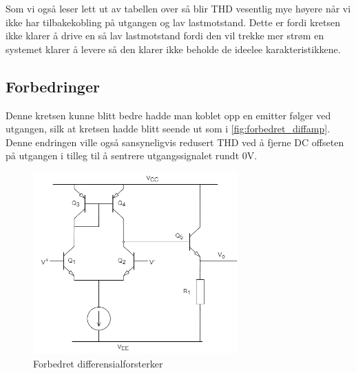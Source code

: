 Som vi også leser lett ut av tabellen over så blir THD vesentlig mye høyere når vi ikke har tilbakekobling på utgangen og lav lastmotstand. Dette er fordi kretsen ikke klarer å drive en så lav lastmotstand fordi den vil trekke mer strøm en systemet klarer å levere så den klarer ikke beholde de ideelee karakteristikkene. 


\subsection{Forbedringer}
\label{forbedringer}
Denne kretsen kunne blitt bedre hadde man koblet opp en emitter følger ved utgangen, silk at kretsen hadde blitt seende ut som i \autoref{fig:forbedret_diffamp}. Denne endringen ville også sansyneligvis redusert THD ved å fjerne DC offseten på utgangen i tilleg til å sentrere utgangssignalet rundt 0V.

\begin{figure}[H]
    \centering
    \includegraphics[width=0.7\textwidth]{Bilder/diffamp_V2.drawio.png}
    \caption{Forbedret differensialforsterker}
    \label{fig:forbedret_diffamp}	
\end{figure}
